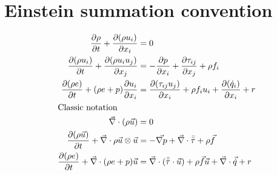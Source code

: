 \documentclass[11pt]{article}
\begin{document}
	\section{Einstein summation convention}
	\begin{align}
		\pdv{\rho}{t}+\pdv{(\rho u_i)}{x_i} &= 0 \\
		\pdv{(\rho u_i)}{t}+\pdv{(\rho u_i u_j)}{x_j} &= -\pdv{p}{x_i}+\pdv{\tau_{ij}}{x_j}+\rho f_i \\
		\pdv{(\rho e)}{t}+(\rho e+p)\pdv{u_i}{x_i} &= \pdv{(\tau_{ij} u_j)}{x_i}+\rho f_i u_i+\pdv{(\dot{q}_i)}{x_i}+r \\
		\intertext{Classic notation}
		\vec{\nabla}\cdot(\rho\vec{u}) &= 0 \\
		\pdv{(\rho \vec{u})}{t}+\vec{\nabla}\cdot\rho\vec{u}\otimes\vec{u} &= -\vec{\nabla p}+\vec{\nabla}\cdot\Bar{\Bar{\tau}}+\rho\vec{f} \\
		\pdv{(\rho e)}{t}+\vec{\nabla}\cdot(\rho e+p)\vec{u} &= \vec{\nabla}\cdot(\Bar{\Bar{\tau}}\cdot\vec{u})+\rho\vec{f}\vec{u}+\vec{\nabla}\cdot\vec{\dot{q}}+r 
	\end{align}
\end{document}
